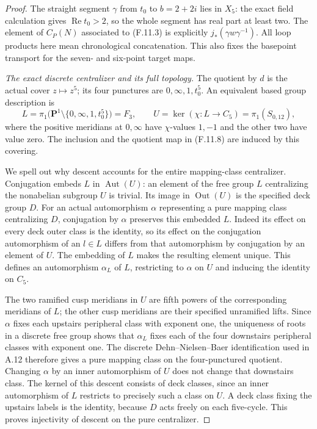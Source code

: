 \begin{proof}
The straight segment $\gamma$ from $t_0$ to
$b=2+2i$ lies in $X_5$: the exact field calculation
gives $\operatorname{Re}t_0>2$, so the whole
segment has real part at least two.
The element of $C_P(N)$ associated to (F.11.3)
is explicitly
$j_*(\gamma w\gamma^{-1})$.
All loop products here mean chronological
concatenation.  This also fixes the basepoint
transport for the seven- and six-point target maps.

\emph{The exact discrete centralizer and its full topology.}
The quotient by $d$ is the actual cover
$z\mapsto z^5$; its four punctures are
$0,\infty,1,t_0^5$.  An equivalent based group
description is
\[
 L=\pi_1\bigl(\mathbf P^1\setminus\{0,\infty,1,t_0^5\}\bigr)
       =F_3,\qquad
 U=\ker(\chi:L\longrightarrow C_5)=\pi_1(S_{0,12}),
                                                               \tag{F.11.8}
\]
where the positive meridians at $0,\infty$ have
$\chi$-values $1,-1$ and the other two have value
zero.  The inclusion and the quotient map in
(F.11.8) are induced by this covering.

We spell out why descent accounts for the entire
mapping-class centralizer.  Conjugation embeds
$L$ in $\operatorname{Aut}(U)$: an element of the
free group $L$ centralizing the nonabelian subgroup
$U$ is trivial.  Its image in $\operatorname{Out}(U)$
is the specified deck group $D$.
For an actual automorphism $\alpha$ representing
a pure mapping class centralizing $D$, conjugation
by $\alpha$ preserves this embedded $L$.
Indeed its effect on every deck outer class is
the identity, so its effect on the conjugation
automorphism of an $l\in L$ differs from that
automorphism by conjugation by an element of $U$.
The embedding of $L$ makes the resulting element
unique.  This defines an automorphism
$\alpha_L$ of $L$, restricting to $\alpha$ on $U$
and inducing the identity on $C_5$.

The two ramified cusp meridians in $U$ are fifth
powers of the corresponding meridians of $L$;
the other cusp meridians are their specified
unramified lifts.  Since $\alpha$ fixes each
upstairs peripheral class with exponent one,
the uniqueness of roots in a discrete free group
shows that $\alpha_L$ fixes each of the four
downstairs peripheral classes with exponent one.
The discrete Dehn--Nielsen--Baer identification
used in A.12 therefore gives a pure mapping class
on the four-punctured quotient.
Changing $\alpha$ by an inner automorphism of $U$
does not change that downstairs class.
The kernel of this descent consists of deck
classes, since an inner automorphism of $L$
restricts to precisely such a class on $U$.
A deck class fixing the upstairs labels is the
identity, because $D$ acts freely on each
five-cycle.  This proves injectivity of descent
on the pure centralizer.


\end{proof}
